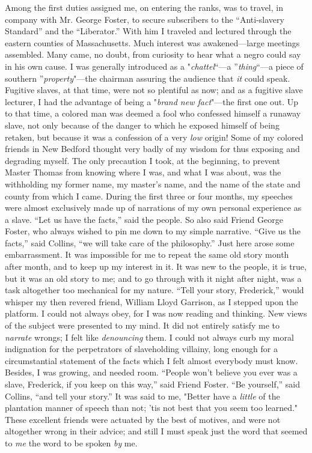 Among the first duties assigned me, on entering the ranks, was to
travel, in company with Mr. George Foster, to secure subscribers to the
``Anti-slavery Standard'' and the ``Liberator.'' With him I traveled and
lectured through the eastern counties of Massachusetts. Much interest
was awakened---large meetings assembled. Many came, no doubt, from
curiosity to hear what a negro could say in his own cause. I was
generally introduced as a "\emph{chattel}``---a ''\emph{thing}``---a
piece of southern ''\emph{property}"---the chairman assuring the
audience that \emph{it} could speak.
{\protect\hypertarget{361}{}{}}Fugitive slaves, at that time, were not
so plentiful as now; and as a fugitive slave lecturer, I had the
advantage of being a "\emph{brand new fact}"---the first one out. Up to
that time, a colored man was deemed a fool who confessed himself a
runaway slave, not only because of the danger to which he exposed
himself of being retaken, but because it was a confession of a very
\emph{low} origin! Some of my colored friends in New Bedford thought
very badly of my wisdom for thus exposing and degrading myself. The only
precaution I took, at the beginning, to prevent Master Thomas from
knowing where I was, and what I was about, was the withholding my former
name, my master's name, and the name of the state and county from which
I came. During the first three or four months, my speeches were almost
exclusively made up of narrations of my own personal experience as a
slave. ``Let us have the facts,'' said the people. So also said Friend
George Foster, who always wished to pin me down to my simple narrative.
``Give us the facts,'' said Collins, ``we will take care of the
philosophy.'' Just here arose some embarrassment. It was impossible for
me to repeat the same old story month after month, and to keep up my
interest in it. It was new to the people, it is true, but it was an old
story to me; and to go through with it night after night, was a task
altogether too mechanical for my nature. ``Tell your story, Frederick,''
would whisper my then revered friend, William Lloyd Garrison, as I
stepped upon the platform. I could not always obey, for I was now
reading and thinking. New views of the subject were presented to my
mind. It {\protect\hypertarget{362}{}{}}did not entirely satisfy me to
\emph{narrate} wrongs; I felt like \emph{denouncing} them. I could not
always curb my moral indignation for the perpetrators of slaveholding
villainy, long enough for a circumstantial statement of the facts which
I felt almost everybody must know. Besides, I was growing, and needed
room. ``People won't believe you ever was a slave, Frederick, if you
keep on this way,'' said Friend Foster. ``Be yourself,'' said Collins,
``and tell your story.'' It was said to me, "Better have a \emph{little}
of the plantation manner of speech than not; 'tis not best that you seem
too learned." These excellent friends were actuated by the best of
motives, and were not altogether wrong in their advice; and still I must
speak just the word that seemed to \emph{me} the word to be spoken
\emph{by} me.

